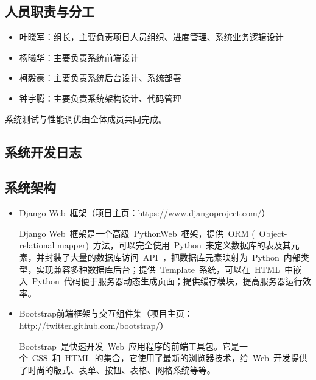 \appendix
\begin{center}
  \section{人员职责与分工}
\end{center}

\begin{itemize}
  \item 叶晓军：组长，主要负责项目人员组织、进度管理、系统业务逻辑设计
  \item 杨曦华：主要负责系统前端设计
  \item 柯毅豪：主要负责系统后台设计、系统部署
  \item 钟宇腾：主要负责系统架构设计、代码管理
\end{itemize}
系统测试与性能调优由全体成员共同完成。

\newpage

\begin{center}
  \section{系统开发日志}
\end{center}
\subsection{系统架构}
\begin{itemize}
  \item Django Web~框架（项目主页：https://www.djangoproject.com/）
  
  \CJKindent Django Web~框架是一个高级~Python\footnotemark[1] Web~框架，提供~ORM (~Object-relational mapper)~方法，可以完全使用~Python~来定义数据库的表及其元素，并封装了大量的数据库访问~API~，把数据库元素映射为~Python~内部类型，实现兼容多种数据库后台；提供~Template~系统，可以在~HTML~中嵌入~Python~代码便于服务器动态生成页面；提供缓存模块，提高服务器运行效率。
  
  \item Bootstrap前端框架与交互组件集（项目主页：http://twitter.github.com/bootstrap/）
  
  \CJKindent Bootstrap~是快速开发~Web~应用程序的前端工具包。它是一个~CSS~和~HTML~的集合，它使用了最新的浏览器技术，给~Web~开发提供了时尚的版式、表单、按钮、表格、网格系统等等。
\end{itemize}



